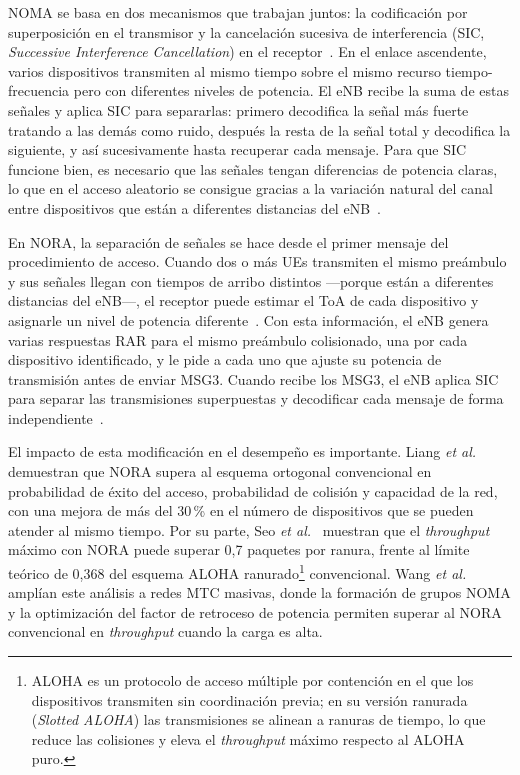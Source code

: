 NOMA se basa en dos mecanismos que trabajan juntos: la codificación por superposición en el
transmisor y la cancelación sucesiva de interferencia (SIC,
\textit{Successive Interference Cancellation}) en el receptor~\cite{ref6, ref13}. En el
enlace ascendente, varios dispositivos transmiten al mismo tiempo sobre el mismo recurso
tiempo-frecuencia pero con diferentes niveles de potencia. El eNB recibe la suma
de estas señales y aplica SIC para separarlas: primero decodifica la señal más fuerte
tratando a las demás como ruido, después la resta de la señal total y decodifica la
siguiente, y así sucesivamente hasta recuperar cada mensaje. Para que SIC funcione bien, es
necesario que las señales tengan diferencias de potencia claras, lo que en el acceso aleatorio
se consigue gracias a la variación natural del canal entre dispositivos que están a diferentes
distancias del eNB~\cite{ref6}.

En NORA, la separación de señales se hace desde el primer mensaje del procedimiento de
acceso. Cuando dos o más UEs transmiten el mismo preámbulo y sus señales llegan con tiempos
de arribo distintos ---porque están a diferentes distancias del eNB---, el
receptor puede estimar el ToA de cada dispositivo y asignarle un nivel de potencia
diferente~\cite{ref4}. Con esta información, el eNB genera varias respuestas RAR
para el mismo preámbulo colisionado, una por cada dispositivo identificado, y le pide a cada
uno que ajuste su potencia de transmisión antes de enviar MSG3. Cuando recibe los MSG3, el
eNB aplica SIC para separar las transmisiones superpuestas y decodificar cada
mensaje de forma independiente~\cite{ref5, ref6}.

El impacto de esta modificación en el desempeño es importante. Liang
\textit{et al.}~\cite{ref5} demuestran que NORA supera al esquema ortogonal convencional en
probabilidad de éxito del acceso, probabilidad de colisión y capacidad de la red, con una
mejora de más del 30\,\% en el número de dispositivos que se pueden atender al mismo tiempo.
Por su parte, Seo \textit{et al.}~\cite{ref6} muestran que el \textit{throughput} máximo con
NORA puede superar 0{,}7 paquetes por ranura, frente al límite teórico de 0{,}368 del
esquema ALOHA ranurado\footnote{ALOHA es un protocolo de acceso múltiple por contención en
el que los dispositivos transmiten sin coordinación previa; en su versión ranurada
(\textit{Slotted ALOHA}) las transmisiones se alinean a ranuras de tiempo, lo que reduce las
colisiones y eleva el \textit{throughput} máximo respecto al ALOHA puro.} convencional. Wang \textit{et al.}~\cite{ref13} amplían este análisis
a redes MTC masivas, donde la formación de grupos NOMA y la optimización del factor de
retroceso de potencia permiten superar al NORA convencional en \textit{throughput} cuando
la carga es alta.

